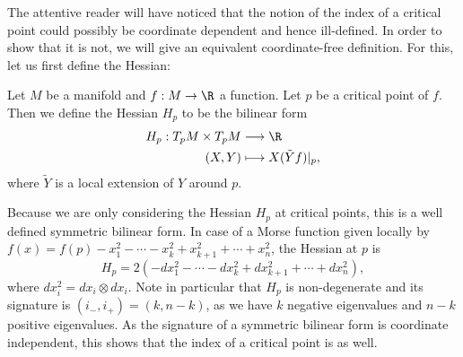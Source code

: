 The attentive reader will have noticed that the notion of the index of a critical point could possibly be coordinate dependent and hence ill-defined.
In order to show that it is not, we will give an equivalent coordinate-free definition.
For this, let us first define the Hessian:
\begin{definition}[Hessian]
    Let $M$ be a manifold and $f: M \to  \R$ a function.
    Let $p$ be a critical point of $f$.
    Then we define the Hessian $H_p$ to be the bilinear form
    \begin{align*}
        H_p: T_pM \times T_pM &\longrightarrow  \R\\
        (X, Y) &\longmapsto X (\tilde{Y} f)|_p
    ,\end{align*} 
    where $\tilde{Y}$ is a local extension of $Y$ around $p$.
\end{definition}
Because we are only considering the Hessian $H_p$ at critical points, this is a well defined symmetric bilinear form. 
In case of a Morse function given locally by $f(x) = f(p) - x_1^2 - \cdots - x_k^2 + x_{k+1}^2 + \cdots + x_n^2$, the Hessian at $p$ is 
\[
    H_p = 2(- dx_1^2 - \cdots - dx_k^2 + dx_{k+1}^2  + \cdots + dx_n^2)
,\] 
where $dx_i^2 = dx_i \otimes dx_i$.
Note in particular that $H_p$ is non-degenerate and its signature is $(i_-, i_{+}) = (k, n-k)$, as we have $k$ negative eigenvalues and $n-k$ positive eigenvalues.
As the signature of a symmetric bilinear form is coordinate independent, this shows that the index of a critical point is as well.


